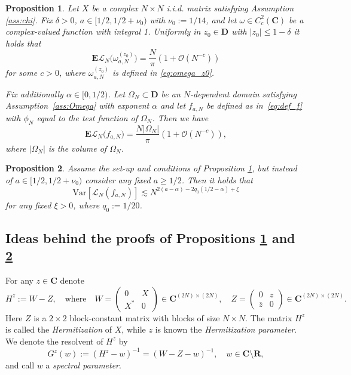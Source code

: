 \documentclass[10pt,a4paper]{amsart}
\newtheorem{proposition}{Proposition}
\newcommand{\C}{\mathbf{C}}
\newcommand{\E}{\mathbf{E}}
\newcommand{\Lin}{\mathcal{L}}
\newcommand{\R}{\mathbf{R}}
\newcommand{\Var}{\mathrm{Var}}
\newcommand{\X}{\mathcal{X}}
\begin{document}
\begin{proposition}\label{prop:E_omega} Let $X$ be a complex $N\times N$ i.i.d. matrix satisfying Assumption \ref{ass:chi}. Fix $\delta>0$, $a\in [1/2,1/2+\nu_0)$ with $\nu_0:=1/14$, and let $\omega\in C^2_c(\C)$ be a complex-valued function with integral 1. Uniformly in $z_0\in\mathbf{D}$ with $|z_0|\le 1-\delta$ it holds that
\begin{equation}
\E\Lin_N\big(\omega_{a,N}^{(z_0)}\big) = \frac{N}{\pi}\left(1+\mathcal{O}(N^{-c})\right)
\label{eq:E_omega}
\end{equation}
for some $c>0$, where $\omega_{a,N}^{(z_0)}$ is defined in \eqref{eq:omega_z0}.

Fix additionally $\alpha\in [0,1/2)$. Let $\Omega_N\subset \mathbf{D}$ be an $N$-dependent domain satisfying Assumption~\ref{ass:Omega} with exponent $\alpha$ and let $f_{a,N}$ be defined as in~\eqref{eq:def_f} with $\phi_N$ equal to the test function of $\Omega_N$. Then we have
\begin{equation}
\E\Lin_N\big(f_{a,N}\big) = \frac{N|\Omega_N|}{\pi}\left(1+\mathcal{O}(N^{-c})\right),
\label{eq:E_f}
\end{equation}
where $|\Omega_N|$ is the volume of $\Omega_N$.
\end{proposition}

\begin{proposition}\label{prop:Var_main} Assume the set-up and conditions of Proposition \ref{prop:E_omega}, but instead of $a\in [1/2,1/2+\nu_0)$ consider any fixed $a\ge 1/2$. Then it holds that
\begin{equation}
\Var\left[ \Lin_N(f_{a,N})\right]\lesssim N^{2(a-\alpha) - 2q_0(1/2-\alpha)+\xi} 
\label{eq:Var_main}
\end{equation}
for any fixed $\xi>0$, where $q_0:=1/20$.
\end{proposition}

\subsection{Ideas behind the proofs of Propositions \ref{prop:E_omega} and \ref{prop:Var_main}}\label{sec:results_list} For any $z\in\C$ denote
\begin{equation}
H^z:=W-Z,\quad \text{where}\quad 
W=\begin{pmatrix}
0&X\\X^*&0
\end{pmatrix}\in \C^{(2N)\times(2N)},\quad
Z=\begin{pmatrix}
0&z\\\overline{z}&0
\end{pmatrix}\in \C^{(2N)\times(2N)}.
\label{eq:def_hermitization}
\end{equation}
Here $Z$ is a $2\times 2$ block-constant matrix with blocks of size $N\times N$. The matrix $H^z$ is called the \emph{Hermitization} of $X$, while $z$ is known the \emph{Hermitization parameter}. We denote the resolvent of $H^z$ by
\begin{equation}
G^z(w):=(H^z-w)^{-1}=(W-Z-w)^{-1},\quad w\in \C\setminus\R,
\label{eq:def_resolvent}
\end{equation}
and call $w$ a \emph{spectral parameter}.
\end{document}
